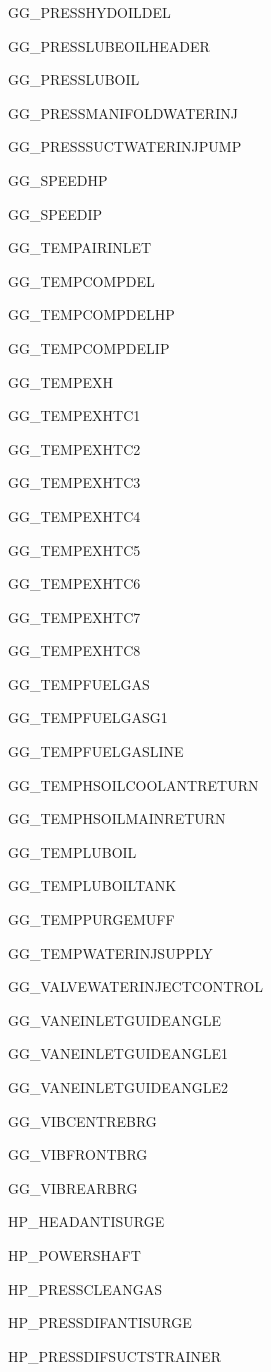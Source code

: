 \documentclass[11pt]{article} %
\theoremstyle{plain}
\theoremstyle{definition}
\begin{document}
\begin{appendices}
\begin{multicols}{2}
\begin{enumerate}
{\item GG\_PRESSHYDOILDEL
\item GG\_PRESSLUBEOILHEADER
\item GG\_PRESSLUBOIL
\item GG\_PRESSMANIFOLDWATERINJ
\item GG\_PRESSSUCTWATERINJPUMP
\item GG\_SPEEDHP
\item GG\_SPEEDIP
\item GG\_TEMPAIRINLET
\item GG\_TEMPCOMPDEL
\item GG\_TEMPCOMPDELHP
\item GG\_TEMPCOMPDELIP
\item GG\_TEMPEXH
\item GG\_TEMPEXHTC1
\item GG\_TEMPEXHTC2
\item GG\_TEMPEXHTC3
\item GG\_TEMPEXHTC4
\item GG\_TEMPEXHTC5
\item GG\_TEMPEXHTC6
\item GG\_TEMPEXHTC7
\item GG\_TEMPEXHTC8
\item GG\_TEMPFUELGAS
\item GG\_TEMPFUELGASG1
\item GG\_TEMPFUELGASLINE
\item GG\_TEMPHSOILCOOLANTRETURN
\item GG\_TEMPHSOILMAINRETURN
\item GG\_TEMPLUBOIL
\item GG\_TEMPLUBOILTANK
\item GG\_TEMPPURGEMUFF
\item GG\_TEMPWATERINJSUPPLY
\item GG\_VALVEWATERINJECTCONTROL
\item GG\_VANEINLETGUIDEANGLE
\item GG\_VANEINLETGUIDEANGLE1
\item GG\_VANEINLETGUIDEANGLE2
\item GG\_VIBCENTREBRG
\item GG\_VIBFRONTBRG
\item GG\_VIBREARBRG
\item HP\_HEADANTISURGE
\item HP\_POWERSHAFT
\item HP\_PRESSCLEANGAS
\item HP\_PRESSDIFANTISURGE
\item HP\_PRESSDIFSUCTSTRAINER
}
\end{enumerate}
\end{multicols}
\end{appendices}
\end{document}
